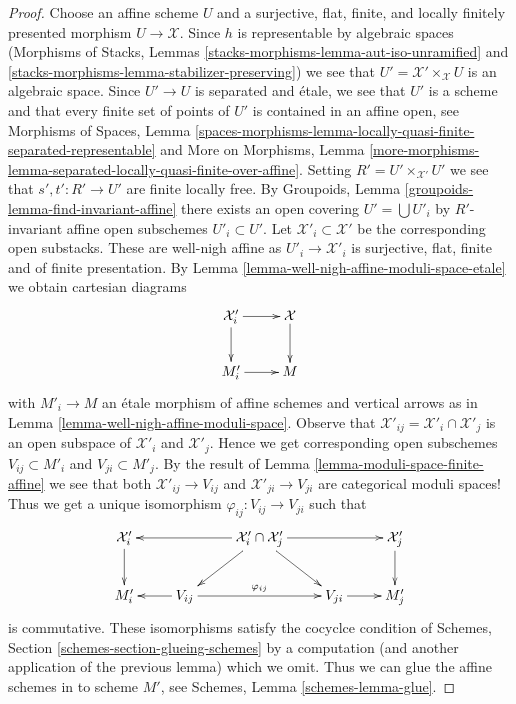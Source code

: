 \documentclass{stacks-project}
\theoremstyle{plain}
\theoremstyle{definition}
\theoremstyle{remark}
\numberwithin{equation}{subsection}
\begin{document}
\begin{proof}
Choose an affine scheme $U$ and a surjective, flat, finite, and
locally finitely presented morphism $U \to \mathcal{X}$.
Since $h$ is representable by algebraic spaces
(Morphisms of Stacks, Lemmas
\ref{stacks-morphisms-lemma-aut-iso-unramified} and
\ref{stacks-morphisms-lemma-stabilizer-preserving})
we see that $U' = \mathcal{X}' \times_\mathcal{X} U$ is
an algebraic space. Since $U' \to U$ is separated and \'etale,
we see that $U'$ is a scheme and that every finite set of points
of $U'$ is contained in an affine open, see
Morphisms of Spaces, Lemma
\ref{spaces-morphisms-lemma-locally-quasi-finite-separated-representable}
and
More on Morphisms, Lemma
\ref{more-morphisms-lemma-separated-locally-quasi-finite-over-affine}.
Setting $R' = U' \times_{\mathcal{X}'} U'$ we see
that $s', t' : R' \to U'$ are finite locally free.
By Groupoids, Lemma \ref{groupoids-lemma-find-invariant-affine}
there exists an open covering $U' = \bigcup U'_i$ by
$R'$-invariant affine open subschemes $U'_i \subset U'$.
Let $\mathcal{X}'_i \subset \mathcal{X}'$ be the corresponding
open substacks. These are well-nigh affine as $U'_i \to \mathcal{X}'_i$
is surjective, flat, finite and of finite presentation. By
Lemma \ref{lemma-well-nigh-affine-moduli-space-etale}
we obtain cartesian diagrams
$$
\xymatrix{
\mathcal{X}'_i \ar[r] \ar[d] & \mathcal{X} \ar[d] \\
M'_i \ar[r] & M
}
$$
with $M'_i \to M$ an \'etale morphism of affine schemes
and vertical arrows as in
Lemma \ref{lemma-well-nigh-affine-moduli-space}.
Observe that
$\mathcal{X}'_{ij} = \mathcal{X}'_i \cap \mathcal{X}'_j$
is an open subspace of $\mathcal{X}'_i$ and $\mathcal{X}'_j$.
Hence we get corresponding open subschemes
$V_{ij} \subset M'_i$ and $V_{ji} \subset M'_j$.
By the result of
Lemma \ref{lemma-moduli-space-finite-affine}
we see that both
$\mathcal{X}'_{ij} \to V_{ij}$ and
$\mathcal{X}'_{ji} \to V_{ji}$ are categorical moduli spaces!
Thus we get a unique isomorphism $\varphi_{ij} : V_{ij} \to V_{ji}$
such that
$$
\xymatrix{
\mathcal{X}'_i \ar[d] & &
\mathcal{X}'_i \cap \mathcal{X}'_j \ar[rr] \ar[ll] \ar[ld] \ar[rd] & &
\mathcal{X}'_j \ar[d] \\
M'_i &
V_{ij} \ar[l] \ar[rr]^{\varphi_{ij}} & &
V_{ji} \ar[r] &
M'_j
}
$$
is commutative. These isomorphisms satisfy the cocyclce condition of
Schemes, Section \ref{schemes-section-glueing-schemes} by a computation
(and another application of the previous lemma) which we omit.
Thus we can glue the affine schemes in to scheme $M'$, see
Schemes, Lemma \ref{schemes-lemma-glue}.

\end{proof}
\end{document}
